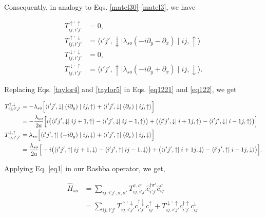 \documentclass[10pt,prb,showpacs,amssymb,floatfix]{revtex4-1}
\begin{document}
Consequently, in analogy to Eqs. \eqref{matel30}-\eqref{matel3}, we have
 
\begin{align}
\label{eq1220}
T_{ij,i'j'}^{\uparrow,\uparrow} &= 0, \\
\label{eq1221}
T_{ij,i'j'}^{\uparrow,\downarrow} &= \langle i'j',\downarrow \mid \lambda_{so}(-i\partial_y - \partial_x) \mid ij,\uparrow \rangle \\
\label{eq1222}
T_{ij,i'j'}^{\downarrow,\downarrow} &= 0, \\
T_{ij,i'j'}^{\downarrow,\uparrow} &= \langle i'j',\uparrow \mid  \lambda_{so}(-i\partial_y + \partial_x) \mid ij,\downarrow \rangle.
\label{eq122}
\end{align}

 
Replacing Eqs. \eqref{taylor4} and \eqref{taylor5} in Eqs. \eqref{eq1221} and \eqref{eq122}, we get

\begin{align}
\label{eq1221a}
T_{ij,i'j'}^{\uparrow,\downarrow} &= -\lambda_{so} \Big{[} \langle i'j',\downarrow \mid (i\partial_y) \mid ij,\uparrow \rangle +\langle i'j',\downarrow \mid (\partial_x) \mid ij,\uparrow \rangle \Big{]} \\
&= -\frac{\lambda_{so}}{2a} \Big{[} i \big{(} \langle i'j',\downarrow \mid  ij+1,\uparrow \rangle - \langle i'j',\downarrow \mid ij-1,\uparrow \rangle \big{)} + \big{(} \langle i'j',\downarrow \mid i+1j,\uparrow \rangle -  \langle i'j',\downarrow \mid i-1j,\uparrow \rangle\big{)} \Big{]} \\
T_{ij,i'j'}^{\downarrow,\uparrow} &= \lambda_{so} \Big{[} \langle i'j',\uparrow \mid (-i\partial_y) \mid ij,\downarrow \rangle + \langle i'j',\uparrow \mid (\partial_x) \mid ij,\downarrow \rangle \Big{]} \\
&= \frac{\lambda_{so}}{2a} \Big{[} -i \big{(} \langle i'j',\uparrow \mid ij+1,\downarrow \rangle -  \langle i'j',\uparrow \mid ij-1,\downarrow \rangle  \big{)}+ \big{(} \langle i'j',\uparrow \mid i+1j,\downarrow \rangle - \langle i'j',\uparrow \mid i-1j,\downarrow \rangle \big{)} \Big{]}.
\label{eq122a}
\end{align}



Applying Eq. \eqref{eq1} in our Rashba operator, we get,

\begin{align}
\hat H_{so} &= \sum_{ij,i'j',\sigma,\sigma'} T_{ij,i'j'}^{\sigma,\sigma'} \hat{c}_{i'j'}^{\dagger \sigma'} \hat{c}_{ij}^\sigma \\
&= \sum_{ij,i'j'}  T_{ij,i'j'}^{\uparrow,\downarrow} c_{i'j'}^{\dagger \downarrow} c_{ij}^\uparrow + T_{ij,i'j'}^{\downarrow,\uparrow} c_{i'j'}^{\dagger \uparrow} c_{ij}^\downarrow.
\label{last}
\end{align}
\end{document}
